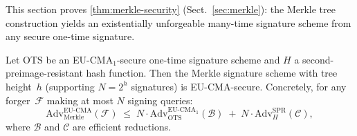 This section proves \cref{thm:merkle-security}
(Sect.~\ref{sec:merkle}): the Merkle tree construction yields
an existentially unforgeable many-time signature scheme from
any secure one-time signature.

\begin{theorem}
\label{thm:merkle-app}
Let $\mathrm{OTS}$ be an EU-CMA$_1$-secure one-time signature
scheme and $H$ a second-preimage-resistant hash function.
Then the Merkle signature scheme with tree height~$h$
(supporting $N = 2^h$ signatures) is EU-CMA-secure.
Concretely, for any forger~$\mathcal{F}$ making at most
$N$ signing queries:
\begin{equation}
\mathrm{Adv}^{\mathrm{EU\text{-}CMA}}_{\mathrm{Merkle}}(\mathcal{F})
\;\leq\;
N \cdot \mathrm{Adv}^{\mathrm{EU\text{-}CMA}_1}_{\mathrm{OTS}}(\mathcal{B})
\;+\; N \cdot \mathrm{Adv}^{\mathrm{SPR}}_{H}(\mathcal{C}),
\end{equation}
where $\mathcal{B}$ and $\mathcal{C}$ are efficient
reductions.
\end{theorem}

